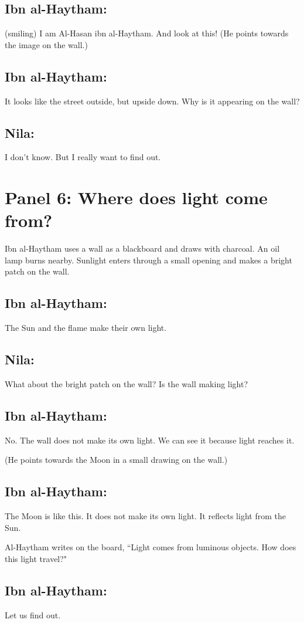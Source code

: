 \documentclass{xtufte-handout}
\begin{document}
\subsection{Ibn al-Haytham:} (smiling) I am Al-Hasan ibn al-Haytham. And look at this! (He points towards the image on the wall.)
\subsection{Ibn al-Haytham:} It looks like the street outside, but upside down. Why is it appearing on the wall?
\subsection{Nila:} I don't know. But I really want to find out.

\section{Panel 6: Where does light come from?}
Ibn al-Haytham uses a wall as a blackboard and draws with charcoal. An oil lamp burns nearby. Sunlight enters through a small opening and makes a bright patch on the wall.

\subsection{Ibn al-Haytham:} The Sun and the flame make their own light.
\subsection{Nila:} What about the bright patch on the wall? Is the wall making light?
\subsection{Ibn al-Haytham:} No. The wall does not make its own light. We can see it because light reaches it.

(He points towards the Moon in a small drawing on the wall.)

\subsection{Ibn al-Haytham:} The Moon is like this. It does not make its own light. It reflects light from the Sun.

Al-Haytham writes on the board, ``Light comes from luminous objects. How does this light travel?"
\subsection{Ibn al-Haytham:} Let us find out.
\end{document}

